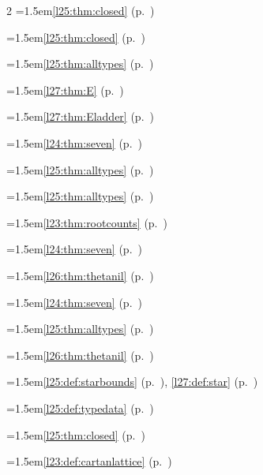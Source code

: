 \begin{multicols}{2}
\hangindent=1.5em\quad \ref{l25:thm:closed} (p.~\pageref{l25:thm:closed})\par
\hangindent=1.5em\quad \ref{l25:thm:closed} (p.~\pageref{l25:thm:closed})\par
\hangindent=1.5em\quad \ref{l25:thm:alltypes} (p.~\pageref{l25:thm:alltypes})\par
\hangindent=1.5em\quad \ref{l27:thm:E} (p.~\pageref{l27:thm:E})\par
\hangindent=1.5em\quad \ref{l27:thm:Eladder} (p.~\pageref{l27:thm:Eladder})\par
\hangindent=1.5em\quad \ref{l24:thm:seven} (p.~\pageref{l24:thm:seven})\par
\hangindent=1.5em\quad \ref{l25:thm:alltypes} (p.~\pageref{l25:thm:alltypes})\par
\hangindent=1.5em\quad \ref{l25:thm:alltypes} (p.~\pageref{l25:thm:alltypes})\par
\hangindent=1.5em\quad \ref{l23:thm:rootcounts} (p.~\pageref{l23:thm:rootcounts})\par
\hangindent=1.5em\quad \ref{l24:thm:seven} (p.~\pageref{l24:thm:seven})\par
\hangindent=1.5em\quad \ref{l26:thm:thetanil} (p.~\pageref{l26:thm:thetanil})\par
\hangindent=1.5em\quad \ref{l24:thm:seven} (p.~\pageref{l24:thm:seven})\par
\hangindent=1.5em\quad \ref{l25:thm:alltypes} (p.~\pageref{l25:thm:alltypes})\par
\hangindent=1.5em\quad \ref{l26:thm:thetanil} (p.~\pageref{l26:thm:thetanil})\par
\hangindent=1.5em\quad \ref{l25:def:starbounds} (p.~\pageref{l25:def:starbounds}), \ref{l27:def:star} (p.~\pageref{l27:def:star})\par
\hangindent=1.5em\quad \ref{l25:def:typedata} (p.~\pageref{l25:def:typedata})\par
\hangindent=1.5em\quad \ref{l25:thm:closed} (p.~\pageref{l25:thm:closed})\par
\hangindent=1.5em\quad \ref{l23:def:cartanlattice} (p.~\pageref{l23:def:cartanlattice})\par

\end{multicols}
